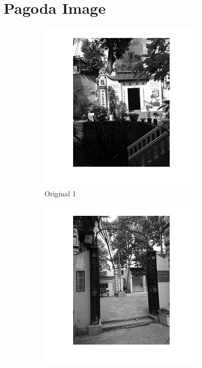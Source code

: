 \section*{Pagoda Image}
\begin{center}
\begin{figure}[h]
        \begin{subfigure}[b]{0.18\textwidth}
                \includegraphics[width=\linewidth]{pagoda1.png}
                \caption{Original 1}
                \label{fig:original 1}
        \end{subfigure}%
        \begin{subfigure}[b]{0.18\textwidth}
                \includegraphics[width=\linewidth]{pagoda2.png}

\end{subfigure}
\end{figure}
\end{center}
